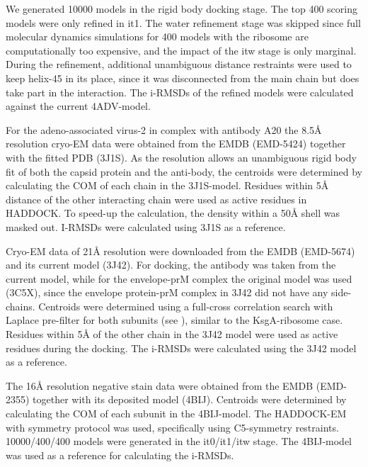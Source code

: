 We generated 10000 models in the rigid body docking stage.  The top 400 scoring
models were only refined in it1.  The water refinement stage was skipped since
full molecular dynamics simulations for 400 models with the ribosome are
computationally too expensive, and the impact of the itw stage is only
marginal.  During the refinement, additional unambiguous distance restraints
were used to keep helix-45 in its place, since it was disconnected from the
main chain but does take part in the interaction.  The i-RMSDs of the refined
models were calculated against the current 4ADV-model.


For the adeno-associated virus-2 in complex with antibody A20 the 8.5Å
resolution cryo-EM data were obtained from the EMDB (EMD-5424) together with
the fitted PDB (3J1S).  As the resolution allows an unambiguous rigid body fit
of both the capsid protein and the anti-body, the centroids were determined by
calculating the COM of each chain in the 3J1S-model.  Residues within
5Å distance of the other interacting chain were used as active
residues in HADDOCK.  To speed-up the calculation, the density within a
50Å shell was masked out.  I-RMSDs were calculated using 3J1S as a
reference. 


Cryo-EM data of 21Å resolution were downloaded from the EMDB
(EMD-5674) and its current model (3J42).  For docking, the antibody was taken
from the current model, while for the envelope-prM complex the original model
was used (3C5X), since the envelope protein-prM complex in 3J42 did not have
any side-chains.  Centroids were determined using a full-cross correlation
search with Laplace pre-filter for both subunits (see
), similar to the KsgA-ribosome case.  Residues
within 5Å of the other chain in the 3J42 model were used as active
residues during the docking.  The i-RMSDs were calculated using the 3J42 model
as a reference.  


The 16Å resolution negative stain data were obtained from the EMDB
(EMD-2355) together with its deposited model (4BIJ).  Centroids were determined
by calculating the COM of each subunit in the 4BIJ-model.  The HADDOCK-EM with
symmetry protocol was used, specifically using C5-symmetry restraints.
10000/400/400 models were generated in the it0/it1/itw stage.  The 4BIJ-model
was used as a reference for calculating the i-RMSDs. 

